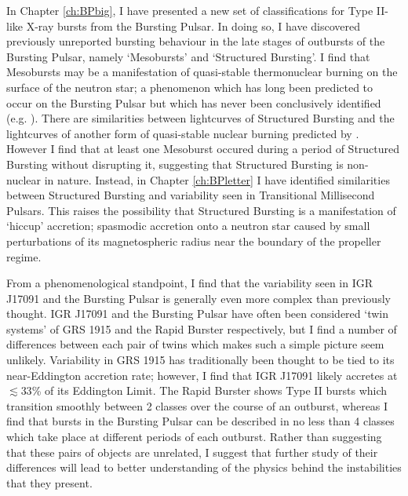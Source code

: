 \par In Chapter \ref{ch:BPbig}, I have presented a new set of classifications for Type II-like X-ray bursts from the Bursting Pulsar.  In doing so, I have discovered previously unreported bursting behaviour in the late stages of outbursts of the Bursting Pulsar, namely `Mesobursts' and `Structured Bursting'.  I find that Mesobursts may be a manifestation of quasi-stable thermonuclear burning on the surface of the neutron star; a phenomenon which has long been predicted to occur on the Bursting Pulsar but which has never been conclusively identified (e.g. \citealp{Bildsten_Nuclear}).  There are similarities between lightcurves of Structured Bursting and the lightcurves of another form of quasi-stable nuclear burning predicted by \citet{Heger_MargStab}.  However I find that at least one Mesoburst occured during a period of Structured Bursting without disrupting it, suggesting that Structured Bursting is non-nuclear in nature.  Instead, in Chapter \ref{ch:BPletter} I have identified similarities between Structured Bursting and variability seen in Transitional Millisecond Pulsars.  This raises the possibility that Structured Bursting is a manifestation of `hiccup' accretion; spasmodic accretion onto a neutron star caused by small perturbations of its magnetospheric radius near the boundary of the propeller regime.
\par From a phenomenological standpoint, I find that the variability seen in IGR J17091 and the Bursting Pulsar is generally even more complex than previously thought.  IGR J17091 and the Bursting Pulsar have often been considered `twin systems' of GRS 1915 and the Rapid Burster respectively, but I find a number of differences between each pair of twins which makes such a simple picture seem unlikely.  Variability in GRS 1915 has traditionally been thought to be tied to its near-Eddington accretion rate; however, I find that IGR J17091 likely accretes at $\lesssim33$\% of its Eddington Limit.  The Rapid Burster shows Type II bursts which transition smoothly between 2 classes over the course of an outburst, whereas I find that bursts in the Bursting Pulsar can be described in no less than 4 classes which take place at different periods of each outburst.  Rather than suggesting that these pairs of objects are unrelated, I suggest that further study of their differences will lead to better understanding of the physics behind the instabilities that they present.
